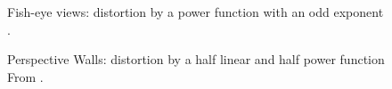 \begin{figure}[H]
    \centering
    \caption{Fish-eye views:  distortion by a power function with an odd exponent \cite{Stroe1999}.}
    \label{fig:fisheye}
\end{figure}

\begin{figure}[H]
    \centering
    \caption{Perspective Walls: distortion by a half linear and half power function From \cite{Stroe1999}.}
    \label{fig:perspectivewall}
\end{figure}

